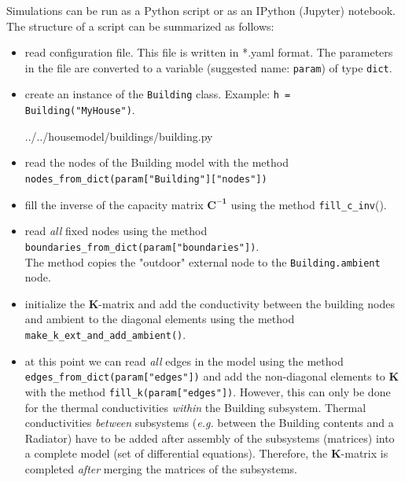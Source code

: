 Simulations can be run as a Python script or as an IPython (Jupyter) notebook. The structure of a script can be summarized as follows:

\begin{itemize}
	\item read configuration file. This file is written in \textsf{*.yaml} format. The parameters in the file are converted to a variable (suggested name: \texttt{param}) of type \texttt{dict}.
	\item create an instance of the \texttt{Building} class. Example: \texttt{h = Building("MyHouse")}.
	
	 
	{../../housemodel/buildings/building.py}
	
	\item read the nodes of the Building model with the method \texttt{nodes\_from\_dict(param["Building"]["nodes"])}
	\item fill the inverse of the capacity matrix $\mathbf{C^{-1}}$ using the method \texttt{fill\_c\_inv}().
	\item read \emph{all} fixed nodes using the method \texttt{boundaries\_from\_dict(param["boundaries"])}. \\ The method copies the "outdoor" external node to the \texttt{Building.ambient} node.
	\item initialize the $\mathbf{K}$-matrix and add the conductivity between the building nodes and ambient to the diagonal elements using the method \texttt{make\_k\_ext\_and\_add\_ambient()}.
	\item at this point we can read \emph{all} edges in the model using the method \texttt{edges\_from\_dict(param["edges"])} and add the non-diagonal elements to $\mathbf{K}$ with the method \texttt{fill\_k(param["edges"])}. However, this can only be done for the thermal conductivities \emph{within} the Building subsystem. Thermal conductivities \emph{between} subsystems (\textit{e.g.} between the Building contents and a Radiator) have to be added after assembly of the subsystems (matrices) into a complete model (set of differential equations). Therefore, the $\mathbf{K}$-matrix is completed \emph{after} merging the matrices of the subsystems. 
\end{itemize}

